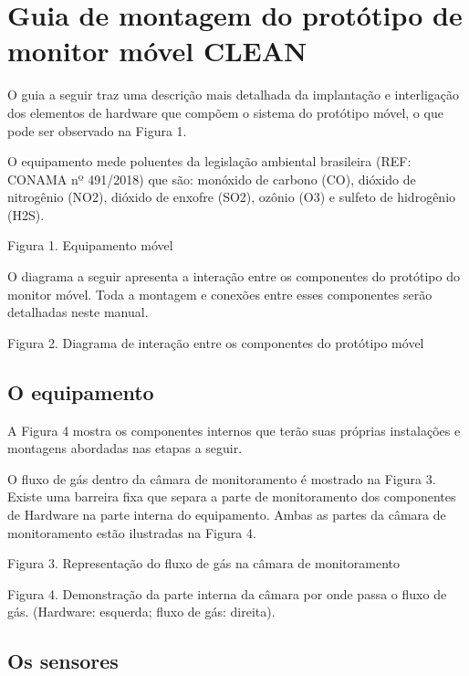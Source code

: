 \chapter{Guia de montagem do protótipo de monitor móvel CLEAN}\label{apendix: mounting-guide-mobile}

O guia a seguir traz uma descrição mais detalhada da implantação e interligação dos elementos de hardware que compõem o sistema do protótipo móvel, o que pode ser observado na Figura 1.

O equipamento mede poluentes da legislação ambiental brasileira (REF: CONAMA nº 491/2018) que são: monóxido de carbono (CO), dióxido de nitrogênio (NO2), dióxido de enxofre (SO2), ozônio (O3) e sulfeto de hidrogênio (H2S).

Figura 1. Equipamento móvel

O diagrama a seguir apresenta a interação entre os componentes do protótipo do monitor móvel. Toda a montagem e conexões entre esses componentes serão detalhadas neste manual.

Figura 2. Diagrama de interação entre os componentes do protótipo móvel

\section{O equipamento}

A Figura 4 mostra os componentes internos que terão suas próprias instalações e montagens abordadas nas etapas a seguir.

O fluxo de gás dentro da câmara de monitoramento é mostrado na Figura 3. Existe uma barreira fixa que separa a parte de monitoramento dos componentes de Hardware na parte interna do equipamento. Ambas as partes da câmara de monitoramento estão ilustradas na Figura 4.

Figura 3. Representação do fluxo de gás na câmara de monitoramento

Figura 4. Demonstração da parte interna da câmara por onde passa o fluxo de gás. (Hardware: esquerda; fluxo de gás: direita).

\section{Os sensores}

